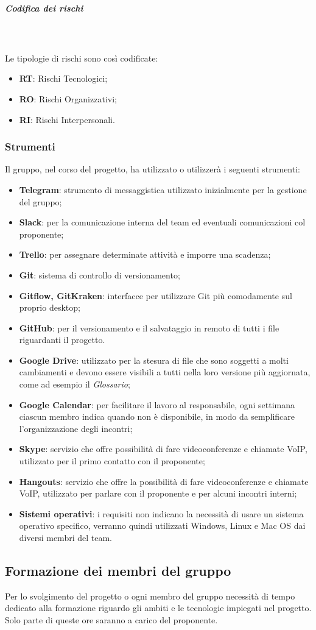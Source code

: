 			\noindent
			\subparagraph{Codifica dei rischi} \mbox{}\\ \mbox{}\\
				Le tipologie di rischi sono così codificate:
				\begin{itemize}
					\item \textbf{RT}: Rischi Tecnologici;
					\item \textbf{RO}: Rischi Organizzativi;
					\item \textbf{RI}: Rischi Interpersonali.
				\end{itemize}

		\subsubsection{Strumenti}
		Il gruppo, nel corso del progetto, ha utilizzato o utilizzerà i seguenti strumenti:
		\begin{itemize}
			\item \textbf{Telegram\glo}: strumento di messaggistica utilizzato inizialmente per la gestione del gruppo;
			\item \textbf{Slack\glo}: per la comunicazione interna del team ed eventuali comunicazioni col proponente;
			\item \textbf{Trello}: per assegnare determinate attività e imporre una scadenza;
			\item \textbf{Git}: sistema di controllo di versionamento;
			\item \textbf{Gitflow, GitKraken}: interfacce per utilizzare Git più comodamente sul proprio desktop;
			\item \textbf{GitHub}: per il versionamento e il salvataggio in remoto di tutti i file riguardanti il progetto.
			\item \textbf{Google Drive}: utilizzato per la stesura di file che sono soggetti a molti cambiamenti e devono essere visibili a tutti nella loro versione più aggiornata, come ad esempio il \textit{Glossario};
			\item \textbf{Google Calendar}: per facilitare il lavoro al responsabile, ogni settimana ciascun membro indica quando non è disponibile, in modo da semplificare l'organizzazione degli incontri;
			\item \textbf{Skype}: servizio che offre possibilità di fare videoconferenze e chiamate VoIP, utilizzato per il primo contatto con il proponente;
			\item \textbf{Hangouts}: servizio che offre la possibilità di fare videoconferenze e chiamate VoIP, utilizzato per parlare con il proponente e per alcuni incontri interni;
			\item \textbf{Sistemi operativi}: i requisiti non indicano la necessità di usare un sistema operativo specifico, verranno quindi utilizzati Windows, Linux e Mac OS dai diversi membri del team. %
		\end{itemize}
	\subsection{Formazione dei membri del gruppo}
	Per lo svolgimento del progetto o ogni membro del gruppo necessità di tempo dedicato alla formazione riguardo gli ambiti e le tecnologie impiegati nel progetto. Solo parte di queste ore saranno a carico del proponente.
